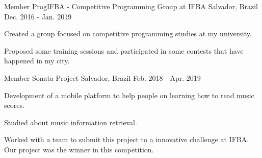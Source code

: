 

\begin{cventries}

  \cventry
    {Member} %
    {ProgIFBA - Competitive Programming Group at IFBA} %
    {Salvador, Brazil} %
    {Dec. 2016 - Jan. 2019} %
    {
      \begin{cvitems} %
        \item {Created a group focused on competitive programming studies at my university.}
        \item {Proposed some training sessions and participated in some contests that have happened in my city.}
      \end{cvitems}
    }

  \cventry
    {Member} %
    {Sonata Project} %
    {Salvador, Brazil} %
    {Feb. 2018 - Apr. 2019} %
    {
      \begin{cvitems} %
        \item {Development of a mobile platform to help people on learning how to read music scores.}
        \item {Studied about music information retrieval.}
       \item {Worked with a team to submit this project to a innovative challenge at IFBA. Our project was the winner in this competition.}
      \end{cvitems}
    }

\end{cventries}
